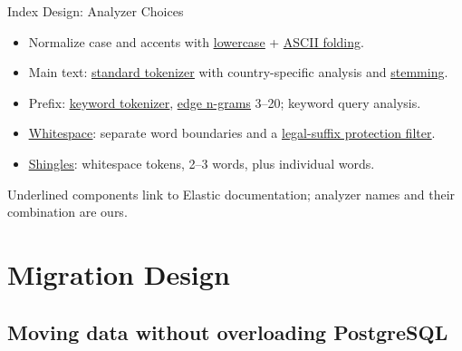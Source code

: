 \documentclass[aspectratio=169]{beamer}
\begin{document}
\begin{frame}{Index Design: Analyzer Choices}
  \small
  \begin{itemize}
    \item Normalize case and accents with \href{https://www.elastic.co/docs/reference/text-analysis/analysis-lowercase-tokenfilter}{\textcolor{PrimaryBlue}{\underline{lowercase}}} + \href{https://www.elastic.co/docs/reference/text-analysis/analysis-asciifolding-tokenfilter}{\textcolor{PrimaryBlue}{\underline{ASCII folding}}}.
    \item Main text: \href{https://www.elastic.co/docs/reference/text-analysis/analysis-standard-tokenizer}{\textcolor{PrimaryBlue}{\underline{standard tokenizer}}} with country-specific analysis and \href{https://www.elastic.co/docs/reference/text-analysis/analysis-stemmer-tokenfilter}{\textcolor{PrimaryBlue}{\underline{stemming}}}.
    \item Prefix: \href{https://www.elastic.co/docs/reference/text-analysis/analysis-keyword-tokenizer}{\textcolor{PrimaryBlue}{\underline{keyword tokenizer}}}, \href{https://www.elastic.co/docs/reference/text-analysis/analysis-edgengram-tokenfilter}{\textcolor{PrimaryBlue}{\underline{edge n-grams}}} 3--20; keyword query analysis.
    \item \href{https://www.elastic.co/docs/reference/text-analysis/analysis-whitespace-tokenizer}{\textcolor{PrimaryBlue}{\underline{Whitespace}}}: separate word boundaries and a \href{https://www.elastic.co/docs/reference/text-analysis/analysis-keyword-marker-tokenfilter}{\textcolor{PrimaryBlue}{\underline{legal-suffix protection filter}}}.
    \item \href{https://www.elastic.co/docs/reference/text-analysis/analysis-shingle-tokenfilter}{\textcolor{PrimaryBlue}{\underline{Shingles}}}: whitespace tokens, 2--3 words, plus individual words.
  \end{itemize}
  {\scriptsize\textcolor{MutedText}{Underlined components link to Elastic documentation; analyzer names and their combination are ours.}}
\end{frame}

\section{Migration Design}
\subsection{Moving data without overloading PostgreSQL}
\end{document}

